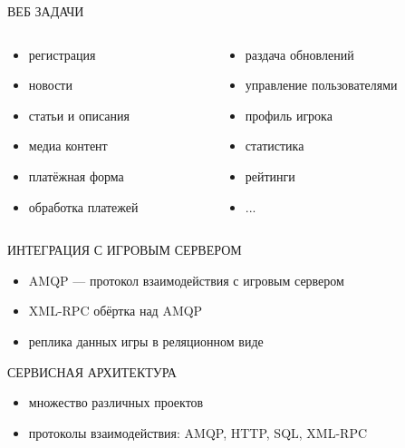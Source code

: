 \documentclass[aspectratio=169]{beamer}
\begin{document}
\begin{frame}{ВЕБ ЗАДАЧИ}
    \begin{columns}
        \begin{column}{0.4\textwidth}
        \begin{itemize}
            \item регистрация
            \item новости
            \item статьи и описания
            \item медиа контент
            \item платёжная форма
            \item обработка платежей
        \end{itemize}
        \end{column}

        \begin{column}{0.4\textwidth}
        \begin{itemize}
            \item раздача обновлений
            \item управление пользователями
            \item профиль игрока
            \item статистика
            \item рейтинги
            \item ...
        \end{itemize}
        \end{column}
    \end{columns}
\end{frame}

\begin{frame}{ИНТЕГРАЦИЯ С ИГРОВЫМ СЕРВЕРОМ}
    \begin{itemize}
        \item AMQP --- протокол взаимодействия с игровым сервером
        \item XML-RPC обёртка над AMQP
        \item реплика данных игры в реляционном виде
    \end{itemize}
\end{frame}

\begin{frame}{СЕРВИСНАЯ АРХИТЕКТУРА}
    \begin{itemize}
        \item множество различных проектов
        \item протоколы взаимодействия: AMQP, HTTP, SQL, XML-RPC
    \end{itemize}
\end{frame}
\end{document}
